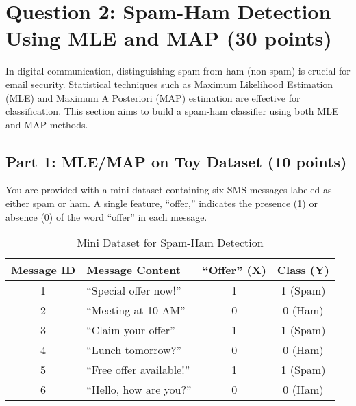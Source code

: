 \documentclass{article}
\begin{document}
  








\section*{Question 2: Spam-Ham Detection Using MLE and MAP (30 points)}
In digital communication, distinguishing spam from ham (non-spam) is crucial for email security. Statistical techniques such as Maximum Likelihood Estimation (MLE) and Maximum A Posteriori (MAP) estimation are effective for classification. This section aims to build a spam-ham classifier using both MLE and MAP methods.

\subsection*{Part 1: MLE/MAP on Toy Dataset (10 points)}
You are provided with a mini dataset containing six SMS messages labeled as either spam or ham. A single feature, ``offer,'' indicates the presence (1) or absence (0) of the word ``offer'' in each message.

\begin{table}[h!]
    \centering
    \begin{tabular}{|c|l|c|c|}
        \hline
        \textbf{Message ID} & \textbf{Message Content} & \textbf{``Offer'' (X)} & \textbf{Class (Y)} \\
        \hline
        1 & ``Special offer now!'' & 1 & 1 (Spam) \\
        2 & ``Meeting at 10 AM'' & 0 & 0 (Ham) \\
        3 & ``Claim your offer'' & 1 & 1 (Spam) \\
        4 & ``Lunch tomorrow?'' & 0 & 0 (Ham) \\
        5 & ``Free offer available!'' & 1 & 1 (Spam) \\
        6 & ``Hello, how are you?'' & 0 & 0 (Ham) \\
        \hline
    \end{tabular}
    \caption{Mini Dataset for Spam-Ham Detection}
\end{table}
\end{document}
